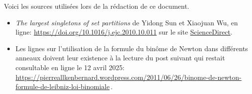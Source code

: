 Voici les sources utilisées lors de la rédaction de ce document.
%
\begin{itemize}[wide]
	\item \emph{\og The largest singletons of set partitions \fg}
de Yidong Sun et Xiaojuan Wu, en ligne:
	\url{https://doi.org/10.1016/j.ejc.2010.10.011}
	sur le site \href{https://www.sciencedirect.com/}{ScienceDirect}.

	\item Les lignes sur l'utilisation de la formule du binôme de Newton dans différents anneaux doivent leur existence à la lecture du post suivant qui restait consultable en ligne le 12 avril 2025:
	\url{https://pierreallkenbernard.wordpress.com/2011/06/26/binome-de-newton-formule-de-leibniz-loi-binomiale}\,. 
\end{itemize}